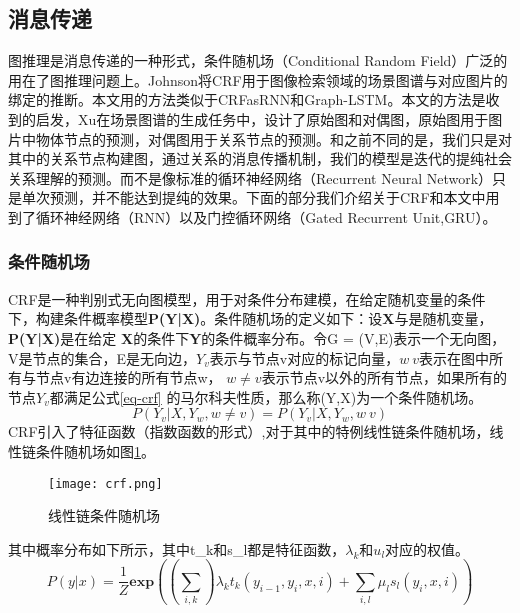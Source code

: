 
\subsection{消息传递}

图推理是消息传递的一种形式，条件随机场（Conditional Random Field）广泛的用在了图推理问题上。Johnson\cite{johnson2015image}将CRF用于图像检索领域的场景图谱与对应图片的绑定的推断。本文用的方法类似于CRFasRNN\cite{zheng2015conditional}和Graph-LSTM\cite{liang2016semantic}。本文的方法是收到\cite{xu2017scene}的启发，Xu在场景图谱的生成任务中，设计了原始图和对偶图，原始图用于图片中物体节点的预测，对偶图用于关系节点的预测。和之前不同的是，我们只是对其中的关系节点构建图，通过关系的消息传播机制，我们的模型是迭代的提纯社会关系理解的预测。而不是像标准的循环神经网络（Recurrent Neural Network）只是单次预测，并不能达到提纯的效果。下面的部分我们介绍关于CRF和本文中用到了循环神经网络（RNN）以及门控循环网络（Gated Recurrent Unit,GRU）。

\subsubsection{条件随机场}
CRF是一种判别式无向图模型，用于对条件分布建模，在给定随机变量的条件下，构建条件概率模型\textbf{P(Y|X)}。条件随机场的定义如下：设\textbf{X}与是随机变量，\textbf{P(Y|X)}是在给定
\textbf{X}的条件下\textbf{Y}的条件概率分布。令G = (V,E)表示一个无向图，V是节点的集合，E是无向边，$Y_{v}$表示与节点v对应的标记向量，$w~v$表示在图中所有与节点v有边连接的所有节点w，
$w \neq v$表示节点v以外的所有节点，如果所有的节点$Y_v$都满足公式\ref{eq-crf}  的马尔科夫性质，那么称(Y,X)为一个条件随机场。
\begin{equation} \label{eq-crf}
    P(Y_{v}|X,Y_w,w \neq v) = P(Y_v|X,Y_w,w~v)
\end{equation}
CRF引入了特征函数（指数函数的形式）,对于其中的特例线性链条件随机场，线性链条件随机场如图\ref{fig:crf}。
\begin{figure}[htpb]
	\centering
	\texttt{[image: crf.png]}
    \caption{线性链条件随机场}
	\vspace*{-3.5mm}
	\label{fig:crf}
\end{figure}
其中概率分布如下所示，其中t_{k}和s_{l}都是特征函数，$\lambda_{k}$和$u_{l}$对应的权值。
\begin{equation}
    P(y|x) = \frac{1}{Z}\mathbf{exp}((\sum_{i,k})\lambda_{k}t_{k}(y_{i-1},y_{i},x,i)+\sum_{i,l}\mu_{l}s_{l}(y_{i},x,i))
\end{equation}

